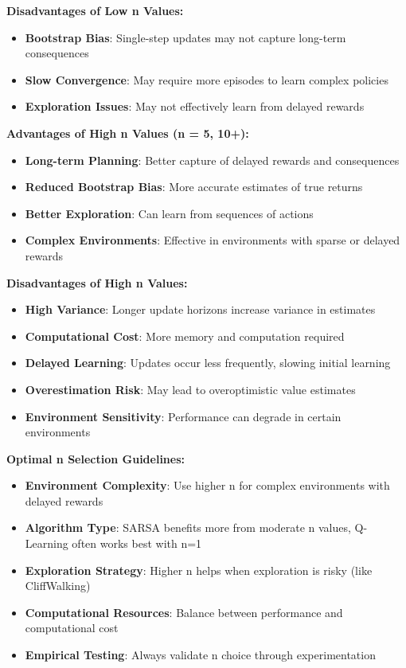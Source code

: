 \documentclass[12pt]{article}
\begin{document}
{{{\textbf{Disadvantages of Low n Values:}
\begin{itemize}
    \item \textbf{Bootstrap Bias}: Single-step updates may not capture long-term consequences
    \item \textbf{Slow Convergence}: May require more episodes to learn complex policies
    \item \textbf{Exploration Issues}: May not effectively learn from delayed rewards
\end{itemize}

\textbf{Advantages of High n Values (n = 5, 10+):}
\begin{itemize}
    \item \textbf{Long-term Planning}: Better capture of delayed rewards and consequences
    \item \textbf{Reduced Bootstrap Bias}: More accurate estimates of true returns
    \item \textbf{Better Exploration}: Can learn from sequences of actions
    \item \textbf{Complex Environments}: Effective in environments with sparse or delayed rewards
\end{itemize}

\textbf{Disadvantages of High n Values:}
\begin{itemize}
    \item \textbf{High Variance}: Longer update horizons increase variance in estimates
    \item \textbf{Computational Cost}: More memory and computation required
    \item \textbf{Delayed Learning}: Updates occur less frequently, slowing initial learning
    \item \textbf{Overestimation Risk}: May lead to overoptimistic value estimates
    \item \textbf{Environment Sensitivity}: Performance can degrade in certain environments
\end{itemize}

\textbf{Optimal n Selection Guidelines:}
\begin{itemize}
    \item \textbf{Environment Complexity}: Use higher n for complex environments with delayed rewards
    \item \textbf{Algorithm Type}: SARSA benefits more from moderate n values, Q-Learning often works best with n=1
    \item \textbf{Exploration Strategy}: Higher n helps when exploration is risky (like CliffWalking)
    \item \textbf{Computational Resources}: Balance between performance and computational cost
    \item \textbf{Empirical Testing}: Always validate n choice through experimentation
\end{itemize}

}}}
\end{document}
